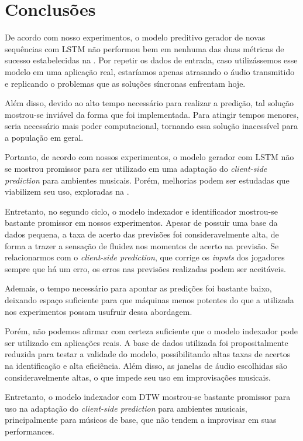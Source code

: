 \chapter{Conclusões}
\label{chap:conclusion}

De acordo com nosso experimentos, o modelo preditivo gerador de novas sequências com LSTM não performou bem em nenhuma das duas métricas de sucesso estabelecidas na . Por repetir os dados de entrada, caso utilizássemos esse modelo em uma aplicação real, estaríamos apenas atrasando o áudio transmitido e replicando o problemas que as soluções síncronas enfrentam hoje.

Além disso, devido ao alto tempo necessário para realizar a predição, tal solução mostrou-se inviável da forma que foi implementada. Para atingir tempos menores, seria necessário mais poder computacional, tornando essa solução inacessível para a população em geral.

Portanto, de acordo com nossos experimentos, o modelo gerador com LSTM não se mostrou promissor para ser utilizado em uma adaptação do \textit{client-side prediction} para ambientes musicais. Porém, melhorias podem ser estudadas que viabilizem seu uso, exploradas na .

Entretanto, no segundo ciclo, o modelo indexador e identificador mostrou-se bastante promissor em nossos experimentos. Apesar de possuir uma base da dados pequena, a taxa de acerto das previsões foi consideravelmente alta, de forma a trazer a sensação de fluidez nos momentos de acerto na previsão. Se relacionarmos com o \textit{client-side prediction}, que corrige os \textit{inputs} dos jogadores sempre que há um erro, os erros nas previsões realizadas podem ser aceitáveis.

Ademais, o tempo necessário para apontar as predições foi bastante baixo, deixando espaço suficiente para que máquinas menos potentes do que a utilizada nos experimentos possam usufruir dessa abordagem.

Porém, não podemos afirmar com certeza suficiente que o modelo indexador pode ser utilizado em aplicações reais. A base de dados utilizada foi propositalmente reduzida para testar a validade do modelo, possibilitando altas taxas de acertos na identificação e alta eficiência. Além disso, as janelas de áudio escolhidas são consideravelmente altas, o que impede seu uso em improvisações musicais.

Entretanto, o modelo indexador com DTW mostrou-se bastante promissor para uso na adaptação do \textit{client-side prediction} para ambientes musicais, principalmente para músicos de base, que não tendem a improvisar em suas performances.

